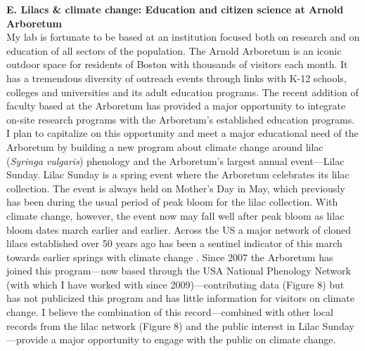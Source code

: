 \documentclass[12pt,a4paper,oneside]{article}
\begin{document}
{\bf E. Lilacs \& climate change: Education and citizen science at Arnold Arboretum}
\vspace{1.5ex}\\
My lab is fortunate to be based at an institution focused both on research and on education of all sectors of the population. The Arnold Arboretum is an iconic outdoor space for residents of Boston with thousands of visitors each month. It has a tremendous diversity of outreach events through links with K-12 schools, colleges and universities and its adult education programs. The recent addition of faculty based at the Arboretum has provided a major opportunity to integrate on-site research programs with the Arboretum's established education programs. 
\vspace{1.5ex}\\
I plan to capitalize on this opportunity and meet a major educational need of the Arboretum by building a new program about climate change around lilac (\emph{Syringa vulgaris}) phenology and the Arboretum's largest annual event---Lilac Sunday. Lilac Sunday is a spring event where the Arboretum celebrates its lilac collection. The event is always held on Mother's Day in May, which previously has been during the usual period of peak bloom for the lilac collection. With climate change, however, the event now may fall well after peak bloom as lilac bloom dates march earlier and earlier. Across the US a major network of cloned lilacs established over 50 years ago has been a sentinel indicator of this march towards earlier springs with climate change \citep{Schwartz2000,Schwartz:2010nx}. Since 2007 the Arboretum has joined this program---now based through the USA National Phenology Network (with which I have worked with since 2009)---contributing data (Figure 8) but has not publicized this program and has little information for visitors on climate change. I believe the combination of this record---combined with other local records from the lilac network (Figure 8) and the public interest in Lilac Sunday---provide a major opportunity to engage with the public on climate change.
\vspace{1.5ex}\\
\end{document}
